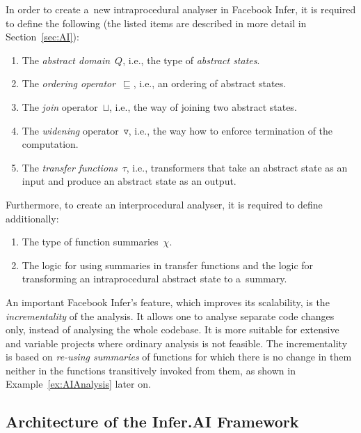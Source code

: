 In order to create a~new intraprocedural analyser in Facebook Infer, it is required to define the following (the listed items are described in more detail in Section~\ref{sec:AI}):
\begin{enumerate}
    \item The \emph{abstract domain}~$ Q $, i.e., the type of \emph{abstract states}.

    \item The \emph{ordering operator}~$ \sqsubseteq $, i.e., an ordering of abstract states.

    \item The \emph{join} operator~$ \sqcup $, i.e., the way of joining two abstract states.

    \item The \emph{widening} operator~$ \triangledown $, i.e., the way how to enforce termination of the computation.

    \item The \emph{transfer functions}~$ \tau $, i.e., transformers that take an abstract state as an input and produce an abstract state as an output.
\end{enumerate}
Furthermore, to create an interprocedural analyser, it is required to define additionally:
\begin{enumerate}
    \item The type of function summaries~$ \chi $.

    \item The logic for using summaries in transfer functions and the logic for transforming an intraprocedural abstract state to a~summary.
\end{enumerate}

An important Facebook Infer's feature, which improves its scalability, is the \emph{incrementality} of the analysis. It allows one to analyse separate code changes only, instead of analysing the whole codebase. It is more suitable for extensive and variable projects where ordinary analysis is not feasible. The incrementality is based on \emph{re-using summaries} of functions for which there is no change in them neither in the functions transitively invoked from them, as shown in Example~\ref{ex:AIAnalysis} later on.

\subsection{Architecture of the Infer.AI Framework}
\label{sec:fbinferArch}

